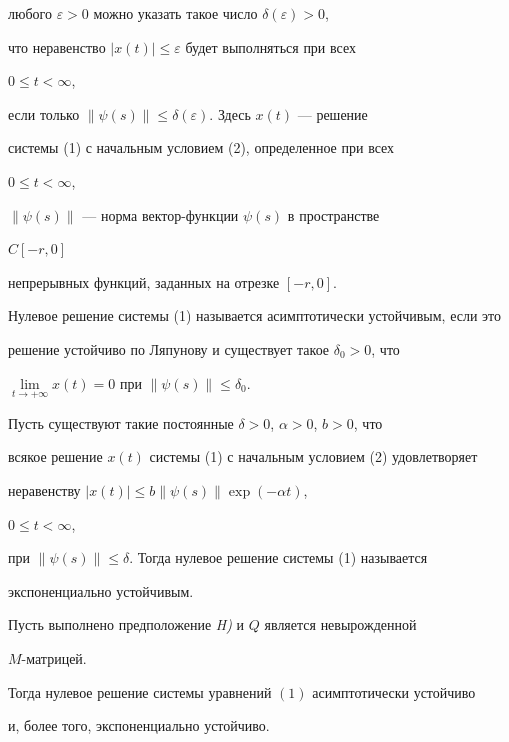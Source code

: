 любого $\varepsilon > 0$ можно указать такое число $\delta(\varepsilon) >0$,


что неравенство $|x(t)| \le \varepsilon$ будет выполняться при всех


$0 \le t < \infty$,


если только $\|\psi(s)\|\le\delta(\varepsilon)$. Здесь $x(t)$ --- решение


системы (1) с начальным условием (2), определенное при всех


$0 \le t < \infty$,


$\|\psi(s)\|$ --- норма вектор-функции $\psi (s)$ в пространстве


$C[-r,0]$


непрерывных функций, заданных на отрезке $[-r,0]$.


Нулевое решение системы (1) называется асимптотически устойчивым, если это


решение устойчиво по Ляпунову и существует такое $\delta_0 >0$, что


$\lim\limits_{t\to +\infty}x(t)=0$ при $\|\psi(s)\|\le \delta_0$.


Пусть существуют такие постоянные $\delta > 0$, $\alpha > 0$, $b > 0$, что


всякое решение $x(t)$ системы (1) с начальным условием (2) удовлетворяет


неравенству $|x(t)| \le b \|\psi(s)\|\exp(-\alpha t)$,


$0 \le t < \infty$,


при $\|\psi(s)\|\le \delta$. Тогда нулевое решение системы (1) называется


экспоненциально устойчивым.





\begin{thm}


Пусть выполнено предположение {\em H)} и $Q$ является невырожденной


$M$-мат\-рицей.


Тогда нулевое решение системы уравнений $(1)$ асимптотически устойчиво


и, более того, экспоненциально устойчиво.


\end{thm}





